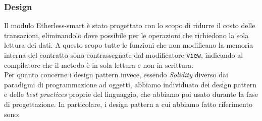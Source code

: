 \subsubsection{Design}
  Il modulo Etherless-smart è stato progettato con lo scopo di ridurre il costo delle transazioni, eliminandolo dove possibile per le operazioni che richiedono la sola lettura dei dati. A questo scopo tutte le funzioni che non modificano la memoria interna del contratto sono contrassegnate dal modificatore \texttt{view}, indicando al compilatore che il metodo è in sola lettura e non in scrittura. \\
  Per quanto concerne i design pattern invece, essendo \textit{Solidity} diverso dai paradigmi di programmazione ad oggetti, abbiamo individuato dei design pattern e delle \textit{best practices} proprie del linguaggio, che abbiamo poi usato durante la fase di progettazione. In particolare, i design pattern a cui abbiamo fatto riferimento sono:
